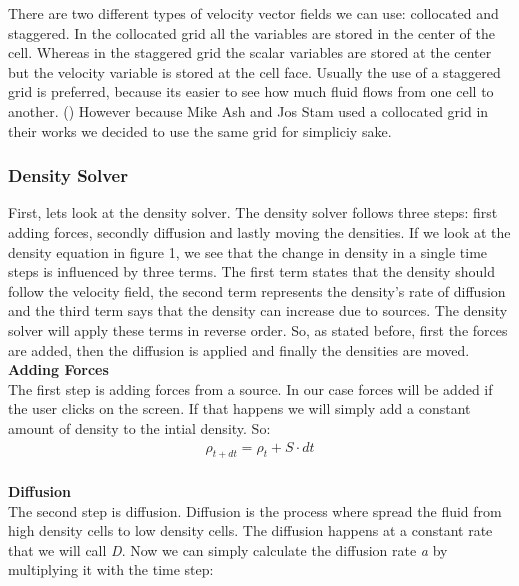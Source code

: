 \documentclass[a4paper,12pt]{article}
\begin{document}
There are two different types of velocity vector fields we can use: collocated and staggered.
In the collocated grid all the variables are stored in the center of the cell. 
Whereas in the staggered grid the scalar variables are stored at the center but the velocity variable is stored at the cell face. 
Usually the use of a staggered grid is preferred, because its easier to see how much fluid flows from one cell to another. (\cite{tenminute})
However because Mike Ash and Jos Stam used a collocated grid in their works we decided to use the same grid for simpliciy sake. \\

\subsubsection{Density Solver} \label{density}

First, lets look at the density solver. The density solver follows three steps: first adding forces, secondly diffusion and lastly moving the densities. 
If we look at the density equation in figure 1, we see that the change in density in a single time steps is influenced by three terms. 
The first term states that the density should follow the velocity field,
the second term represents the density's rate of diffusion
and the third term says that the density can increase due to sources. 
The density solver will apply these terms in reverse order. 
So, as stated before, first the forces are added, then the diffusion is applied and finally the densities are moved. \\

\textbf{Adding Forces} \\

The first step is adding forces from a source. In our case forces will be added if the user clicks on the screen.
If that happens we will simply add a constant amount of density to the intial density. So:   \\

\[
\begin{array}{ll}
  \rho_{t+dt} = \rho_t + S \cdot dt
\end{array}
\] \\

\textbf{Diffusion} \\

The second step is diffusion.
Diffusion is the process where spread the fluid from high density cells to low density cells.
The diffusion happens at a constant rate that we will call \textit{D}. 
Now we can simply calculate the diffusion rate \textit{a} by multiplying it with the time step:
\end{document}
